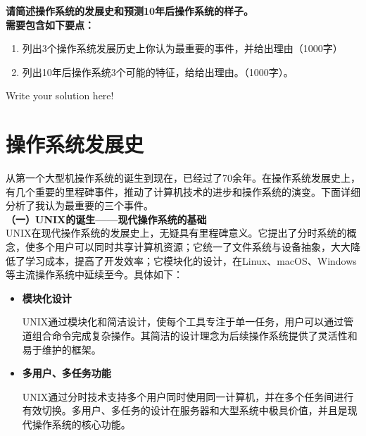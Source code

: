 \documentclass[UTF8]{homework}
\begin{document}
\maketitle
\if{}
    \pagebreak
\fi


%
%
\begin{homeworkProblem}
\textbf{    请简述操作系统的发展史和预测10年后操作系统的样子。\\
	需要包含如下要点：}
    \begin{enumerate}
    	\item 列出3个操作系统发展历史上你认为最重要的事件，并给出理由（1000字）
    	\item 列出10年后操作系统3个可能的特征，给给出理由。（1000字）。
    \end{enumerate}
    
    \solution

    Write your solution here!

\section{操作系统发展史}

从第一个大型机操作系统的诞生到现在，已经过了70余年。在操作系统发展史上，有几个重要的里程碑事件，推动了计算机技术的进步和操作系统的演变。下面详细分析了我认为最重要的三个事件。 \\

\textbf{（一）UNIX的诞生——现代操作系统的基础}\\

UNIX在现代操作系统的发展史上，无疑具有里程碑意义。它提出了分时系统的概念，使多个用户可以同时共享计算机资源；它统一了文件系统与设备抽象，大大降低了学习成本，提高了开发效率；它模块化的设计，在Linux、macOS、Windows等主流操作系统中延续至今。具体如下：\\

\begin{itemize}
	\item \textbf{模块化设计}
	
	UNIX通过模块化和简洁设计，使每个工具专注于单一任务，用户可以通过管道组合命令完成复杂操作。其简洁的设计理念为后续操作系统提供了灵活性和易于维护的框架。
	
	\item \textbf{多用户、多任务功能}
	
	UNIX通过分时技术支持多个用户同时使用同一计算机，并在多个任务间进行有效切换。多用户、多任务的设计在服务器和大型系统中极具价值，并且是现代操作系统的核心功能。
	

\end{itemize}
\end{homeworkProblem}
\end{document}
